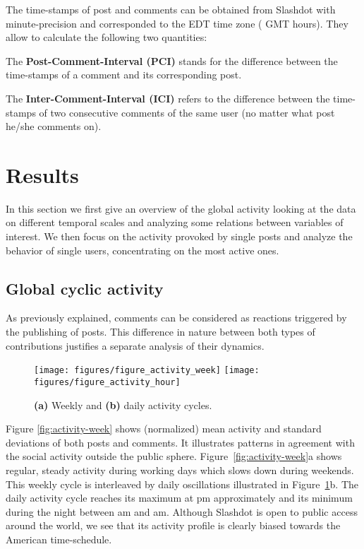 \documentclass[twoside,11pt]{article}
\begin{document}
The time-stamps of post and comments can be obtained from Slashdot
with minute-precision and corresponded to the EDT time zone (
GMT hours).  They allow to calculate the following two quantities:

The \textbf{Post-Comment-Interval (PCI)} stands for the difference
between the time-stamps of a comment and its corresponding post.

The \textbf{Inter-Comment-Interval (ICI)} refers to the difference
between the time-stamps of two consecutive comments of the same user
(no matter what post he/she comments on).


\section{Results}
\label{sec:results}
\noindent
In this section we first give an overview of the global activity
looking at the data on different temporal scales and analyzing some
relations between variables of interest.  We then focus on the
activity provoked by single posts and analyze the behavior of single
users, concentrating on the most active ones.

\subsection{Global cyclic activity}
\label{sec:global}
\noindent
As previously explained, comments can be considered as reactions
triggered by the publishing of posts. This difference in nature
between both types of contributions justifies a separate analysis of
their dynamics.

\begin{figure}[!tb]\centering
\texttt{[image: figures/figure\_activity\_week]}
\texttt{[image: figures/figure\_activity\_hour]}
\caption{\textbf{(a)} Weekly and \textbf{(b)} daily activity cycles.}
\label{fig:activity-week}
\label{fig:activity-hour}
\end{figure}

Figure \ref{fig:activity-week} shows (normalized) mean activity and
standard deviations of both posts and comments.  It illustrates
patterns in agreement with the social activity outside the public
sphere.  Figure~\ref{fig:activity-week}a shows regular, steady
activity during working days which slows down during weekends.  This
weekly cycle is interleaved by daily oscillations illustrated in
Figure~\ref{fig:activity-hour}b.  The daily activity cycle reaches its
maximum at pm approximately and its minimum during the night
between am and am.  Although Slashdot is open to public access
around the world, we see that its activity profile is clearly biased
towards the American time-schedule.
\end{document}
